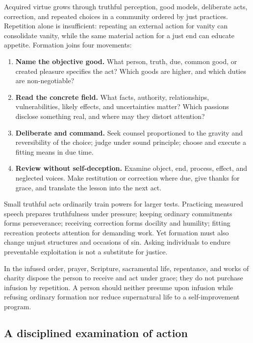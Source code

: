 Acquired virtue grows through truthful perception, good models, deliberate acts, correction, and repeated choices in a community ordered by just practices. Repetition alone is insufficient: repeating an external action for vanity can consolidate vanity, while the same material action for a just end can educate appetite. Formation joins four movements:

\begin{enumerate}[leftmargin=1.55em,itemsep=0.3em]
  \item \textbf{Name the objective good.} What person, truth, due, common good, or created pleasure specifies the act? Which goods are higher, and which duties are non-negotiable?
  \item \textbf{Read the concrete field.} What facts, authority, relationships, vulnerabilities, likely effects, and uncertainties matter? Which passions disclose something real, and where may they distort attention?
  \item \textbf{Deliberate and command.} Seek counsel proportioned to the gravity and reversibility of the choice; judge under sound principle; choose and execute a fitting means in due time.
  \item \textbf{Review without self-deception.} Examine object, end, process, effect, and neglected voices. Make restitution or correction where due, give thanks for grace, and translate the lesson into the next act.
\end{enumerate}

Small truthful acts ordinarily train powers for larger tests. Practicing measured speech prepares truthfulness under pressure; keeping ordinary commitments forms perseverance; receiving correction forms docility and humility; fitting recreation protects attention for demanding work. Yet formation must also change unjust structures and occasions of sin. Asking individuals to endure preventable exploitation is not a substitute for justice.

In the infused order, prayer, Scripture, sacramental life, repentance, and works of charity dispose the person to receive and act under grace; they do not purchase infusion by repetition. A person should neither presume upon infusion while refusing ordinary formation nor reduce supernatural life to a self-improvement program.

\subsection{A disciplined examination of action}

